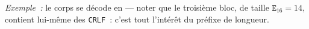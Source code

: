 \documentclass[11pt,a4paper]{article}
\begin{document}
\emph{Exemple~:} le corps 
se décode en  — noter que le troisième bloc, de
taille $\texttt{E}_{16}=14$, contient lui-même des \texttt{CRLF}~: c'est tout l'intérêt du
préfixe de longueur.
\end{document}
